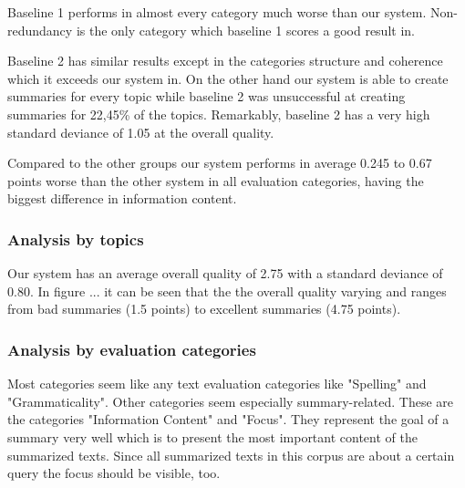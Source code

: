 Baseline 1 performs in almost every category much worse than our system. Non-redundancy is the only category which baseline 1 scores a good result in.

Baseline 2 has similar results except in the categories structure and coherence which it exceeds our system in. On the other hand our system is able to create summaries for every topic while baseline 2 was unsuccessful at creating summaries for 22,45\% of the topics. Remarkably, baseline 2 has a very high standard deviance of 1.05 at the overall quality.

Compared to the other groups our system performs in average 0.245 to 0.67 points worse than the other system in all evaluation  categories, having the biggest difference in information content.  


\subsubsection{Analysis by topics}

Our system has an average overall quality of 2.75 with a standard deviance of 0.80. In figure ... it can be seen that the the overall quality varying and ranges from bad summaries (1.5 points) to excellent summaries (4.75 points).

\subsubsection{Analysis by evaluation categories}
Most categories seem like any text evaluation categories like "Spelling" and "Grammaticality". Other categories seem especially summary-related. These are the categories "Information Content" and "Focus". They represent the goal of a summary very well which is to present the most important content of the summarized texts. Since all summarized texts in this corpus are about a certain query the focus should be visible, too.

